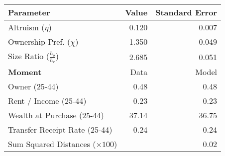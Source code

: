 \begin{tabular}{lrr}
\toprule   
 \textbf{Parameter} & Value & Standard Error\\
\midrule
Altruism ($\eta$) & 0.120 & 0.007\\
Ownership Pref. ($\chi$) & 1.350 & 0.049\\
Size Ratio ($\frac{h_o}{h_r}$) & 2.685 & 0.051\\
\cmidrule(lr){1-3} 

 
\textbf{Moment} & Data & Model\\
\midrule
Owner (25-44) & 0.48 & 0.48\\
Rent / Income (25-44) & 0.23 & 0.23\\
Wealth at Purchase (25-44) & 37.14 & 36.75\\
Transfer Receipt Rate (25-44) & 0.24 & 0.24\\
\midrule 
 Sum Squared Distances ($ \times 100$) &  & 0.02\\
\bottomrule
\end{tabular}
